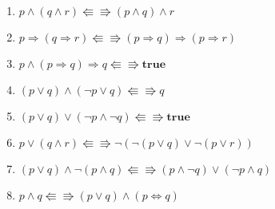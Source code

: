 \begin{enumerate}
	\item $p \wedge (q \wedge r)  \Lleftarrow\!\!\!\!\Rrightarrow (p \wedge q) \wedge r$
	\item $p \Rightarrow (q \Rightarrow r) \Lleftarrow\!\!\!\!\Rrightarrow (p \Rightarrow q) \Rightarrow (p \Rightarrow r)$
	\item $p \wedge (p \Rightarrow q) \Rightarrow q \Lleftarrow\!\!\!\!\Rrightarrow \textbf{true}$
	\item $(p \vee q) \wedge (\neg p \vee q) \Lleftarrow\!\!\!\!\Rrightarrow q$
	\item $(p \vee q) \vee (\neg p \wedge \neg q) \Lleftarrow\!\!\!\!\Rrightarrow \textbf{true}$
	\item $p \vee (q \wedge r) \Lleftarrow\!\!\!\!\Rrightarrow \neg (\neg (p \vee q) \vee \neg (p \vee r))$
	\item $(p \vee q) \wedge \neg (p \wedge q) \Lleftarrow\!\!\!\!\Rrightarrow (p \wedge \neg q) \vee (\neg p \wedge q)$
	\item $p \wedge q \Lleftarrow\!\!\!\!\Rrightarrow (p \vee q) \wedge (p \Leftrightarrow q)$
\end{enumerate}

